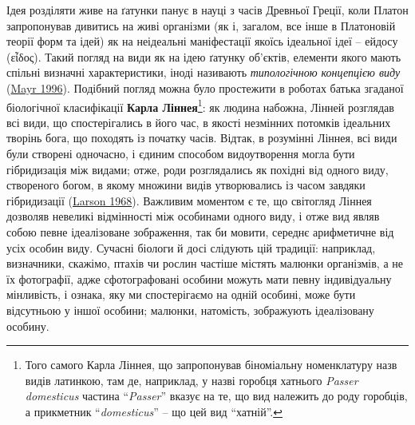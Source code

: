 \documentclass[
  11pt,
]{book}
\begin{document}
Ідея розділяти живе на ґатунки панує в науці з часів Древньої Греції, коли Платон запропонував дивитись на живі організми (як і, загалом, все інше в Платоновій теорії форм та ідей) як на неідеальні маніфестації якоїсь ідеальної ідеї -- ейдосу (εἶδος). Такий погляд на види як на ідею ґатунку об'єктів, елементи якого мають спільні визначні характеристики, іноді називають \emph{типологічною концепцією виду} (\href{https://doi.org/10.1086/289912}{Mayr 1996}). Подібний погляд можна було простежити в роботах батька згаданої біологічної класифікації \textbf{Карла Ліннея}\footnote{Того самого Карла Ліннея, що запропонував біноміальну номенклатуру назв видів латинкою, там де, наприклад, у назві горобця хатнього \emph{Passer domesticus} частина ``\emph{Passer}'' вказує на те, що вид належить до роду горобців, а прикметник ``\emph{domesticus}'' -- що цей вид ``хатній''.}: як людина набожна, Лінней розглядав всі види, що спостерігались в його час, в якості незмінних потомків ідеальних творінь бога, що походять із початку часів. Відтак, в розумінні Ліннея, всі види були створені одночасно, і єдиним способом видоутворення могла бути гібридизація між видами; отже, роди розглядались як похідні від одного виду, створеного богом, в якому множини видів утворювались із часом завдяки гібридизації (\href{https://doi.org/10.1086/350398}{Larson 1968}). Важливим моментом є те, що світогляд Ліннея дозволяв невеликі відмінності між особинами одного виду, і отже вид являв собою певне ідеалізоване зображення, так би мовити, середнє арифметичне від усіх особин виду. Сучасні біологи й досі слідують цій традиції: наприклад, визначники, скажімо, птахів чи рослин частіше містять малюнки організмів, а не їх фотографії, адже сфотографовані особини можуть мати певну індивідуальну мінливість, і ознака, яку ми спостерігаємо на одній особині, може бути відсутньою у іншої особини; малюнки, натомість, зображують ідеалізовану особину.
\end{document}
